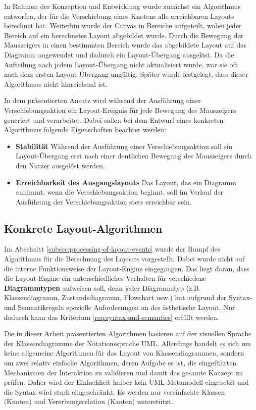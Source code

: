 In Rahmen der Konzeption und Entwicklung wurde zunächst ein Algorithmus entworfen, der für die Verschiebung eines Knotens alle erreichbaren Layouts berechnet hat. Weiterhin wurde der Canvas in Bereiche aufgeteilt, wobei jeder Bereich auf ein berechnetes Layout abgebildet wurde. Durch die Bewegung der Mauszeigers in einen bestimmten Bereich wurde das abgebildete Layout auf das Diagramm angewendet und dadurch ein Layout-Übergang ausgelöst. Da die Aufteilung nach jedem Layout-Übergang nicht aktualisiert wurde, war sie oft nach dem ersten Layout-Übergang ungültig. Später wurde festgelegt, dass dieser Algorithmus nicht hinreichend ist.

In dem präsentierten Ansatz wird während der Ausführung einer Verschiebungsaktion ein Layout-Ereignis für jede Bewegung des Mauszeigers generiert und verarbeitet. Dabei sollen bei dem Entwurf eines konkreten Algorithmus folgende Eigenschaften beachtet werden:

\begin{itemize}
    \item \textbf{Stabilität} Während der Ausführung einer Verschiebungsaktion soll ein Layout-Übergang erst nach einer deutlichen Bewegung des Mauszeigers durch den Nutzer ausgelöst werden.
    \item \textbf{Erreichbarkeit des Ausgangslayouts} Das Layout, das ein Diagramm annimmt, wenn die Verschiebungsaktion beginnt, soll im Verlauf der Ausführung der Verschiebungsaktion stets erreichbar sein.
\end{itemize}

\subsection{Konkrete Layout-Algorithmen}
\label{subsec:concrete-layout-algorithms}

Im Abschnitt \ref{subsec:processing-of-layout-events} wurde der Rumpf des Algorithmus für die Berechnung des Layouts vorgestellt. Dabei wurde nicht auf die interne Funktionsweise der Layout-Engine eingegangen. Das liegt daran, dass die Layout-Engine ein unterschiedliches Verhalten für verschiedene \textbf{Diagrammtypen} aufweisen soll, denn jeder Diagrammtyp (z.B. Klassendiagramm, Zustandsdiagramm, Flowchart usw.) hat aufgrund der Syntax- und Semantikregeln spezielle Anforderungen an des ästhetische Layout. Nur dadurch kann das Kriterium \ref{req:syntax-and-semantics} erfüllt werden.

Die in dieser Arbeit präsentierten Algorithmen basieren auf der visuellen Sprache der Klassendiagramme der Notationssprache UML. Allerdings handelt es sich um keine allgemeine Algorithmen für das Layout von Klassendiagrammen, sondern um zwei relativ einfache Algorithmen, deren Aufgabe es ist, die eingeführten Mechanismen der Interaktion zu validieren und damit das gesamte Konzept zu prüfen. Daher wird der Einfachheit halber kein UML-Metamodell eingesetzt und die Syntax wird stark eingeschränkt. Es werden nur vereinfachte Klassen (Knoten) und Vererbungsrelation (Kanten) unterstützt.

